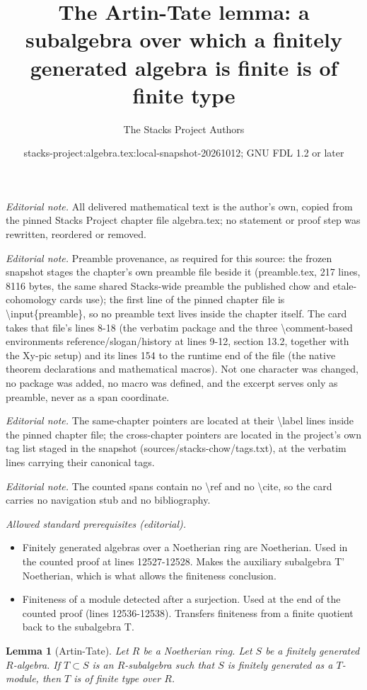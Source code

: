 \documentclass[10pt,a4paper]{amsart}
\title{The Artin-Tate lemma: a subalgebra over which a finitely generated algebra is finite is of finite type}
\author{The Stacks Project Authors}
\date{stacks-project:algebra.tex:local-snapshot-20261012; GNU FDL 1.2 or later}
\theoremstyle{plain}
\newtheorem{lemma}[subsection]{Lemma}
\theoremstyle{definition}
\theoremstyle{remark}
\numberwithin{equation}{subsection}
\begin{document}
\maketitle
\noindent\textit{Editorial note.} All delivered mathematical text is the author's own, copied from the pinned Stacks Project chapter file algebra.tex; no statement or proof step was rewritten, reordered or removed.\par\medskip
\noindent\textit{Editorial note.} Preamble provenance, as required for this source: the frozen snapshot stages the chapter's own preamble file beside it (preamble.tex, 217 lines, 8116 bytes, the same shared Stacks-wide preamble the published chow and etale-cohomology cards use); the first line of the pinned chapter file is \textbackslash{}input\{preamble\}, so no preamble text lives inside the chapter itself. The card takes that file's lines 8-18 (the verbatim package and the three \textbackslash{}comment-based environments reference/slogan/history at lines 9-12, section 13.2, together with the Xy-pic setup) and its lines 154 to the runtime end of the file (the native theorem declarations and mathematical macros). Not one character was changed, no package was added, no macro was defined, and the excerpt serves only as preamble, never as a span coordinate.\par\medskip
\noindent\textit{Editorial note.} The same-chapter pointers are located at their \textbackslash{}label lines inside the pinned chapter file; the cross-chapter pointers are located in the project's own tag list staged in the snapshot (sources/stacks-chow/tags.txt), at the verbatim lines carrying their canonical tags.\par\medskip
\noindent\textit{Editorial note.} The counted spans contain no \textbackslash{}ref and no \textbackslash{}cite, so the card carries no navigation stub and no bibliography.\par\medskip
\noindent\textit{Allowed standard prerequisites (editorial).}\begin{itemize}
\item Finitely generated algebras over a Noetherian ring are Noetherian. Used in the counted proof at lines 12527-12528. Makes the auxiliary subalgebra T' Noetherian, which is what allows the finiteness conclusion.
\item Finiteness of a module detected after a surjection. Used at the end of the counted proof (lines 12536-12538). Transfers finiteness from a finite quotient back to the subalgebra T.
\end{itemize}\medskip
\begin{lemma}[Artin-Tate]
\label{lemma-Artin-Tate}
Let $R$ be a Noetherian ring. Let $S$ be a finitely
generated $R$-algebra. If $T \subset S$ is an $R$-subalgebra such
that $S$ is finitely generated as a $T$-module, then $T$ is of
finite type over $R$.
\end{lemma}
\end{document}

